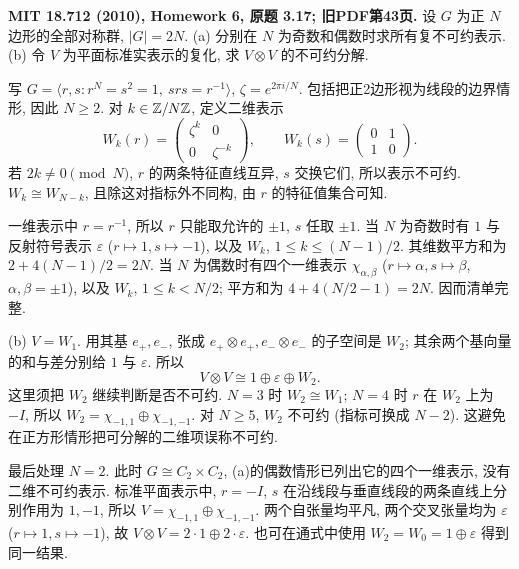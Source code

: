 \begin{exercise}\label{hw:3.17}
\textbf{MIT 18.712 (2010), Homework 6, 原题 3.17; 旧PDF第43页.}
设 $G$ 为正 $N$ 边形的全部对称群, $|G|=2N$.
(a) 分别在 $N$ 为奇数和偶数时求所有复不可约表示.
(b) 令 $V$ 为平面标准实表示的复化, 求 $V\otimes V$ 的不可约分解.
\end{exercise}
\begin{solution}
写 $G=\langle r,s:r^N=s^2=1,\ srs=r^{-1}\rangle$, $\zeta=e^{2\pi i/N}$. 包括把正2边形视为线段的边界情形, 因此 $N\ge2$. 对 $k\in\mathbb Z/N\mathbb Z$, 定义二维表示
\[
 W_k(r)=\begin{pmatrix}\zeta^k&0\\0&\zeta^{-k}\end{pmatrix},
 \qquad W_k(s)=\begin{pmatrix}0&1\\1&0\end{pmatrix}.
\]
若 $2k\ne0\pmod N$, $r$ 的两条特征直线互异, $s$ 交换它们, 所以表示不可约. $W_k\cong W_{N-k}$, 且除这对指标外不同构, 由 $r$ 的特征值集合可知.

一维表示中 $r=r^{-1}$, 所以 $r$ 只能取允许的 $\pm1$, $s$ 任取 $\pm1$. 当 $N$ 为奇数时有 $1$ 与反射符号表示 $\varepsilon$ ($r\mapsto1,s\mapsto-1$), 以及 $W_k$, $1\le k\le(N-1)/2$. 其维数平方和为 $2+4(N-1)/2=2N$. 当 $N$ 为偶数时有四个一维表示 $\chi_{\alpha,\beta}$ ($r\mapsto\alpha,s\mapsto\beta$, $\alpha,\beta=\pm1$), 以及 $W_k$, $1\le k<N/2$; 平方和为 $4+4(N/2-1)=2N$. 因而清单完整.

(b) $V=W_1$. 用其基 $e_+,e_-$, 张成 $e_+\otimes e_+,e_-\otimes e_-$ 的子空间是 $W_2$; 其余两个基向量的和与差分别给 $1$ 与 $\varepsilon$. 所以
\[
 V\otimes V\cong1\oplus\varepsilon\oplus W_2.
\]
这里须把 $W_2$ 继续判断是否不可约. $N=3$ 时 $W_2\cong W_1$; $N=4$ 时 $r$ 在 $W_2$ 上为 $-I$, 所以 $W_2=\chi_{-1,1}\oplus\chi_{-1,-1}$. 对 $N\ge5$, $W_2$ 不可约 (指标可换成 $N-2$). 这避免在正方形情形把可分解的二维项误称不可约.

最后处理 $N=2$. 此时 $G\cong C_2\times C_2$, (a)的偶数情形已列出它的四个一维表示, 没有二维不可约表示. 标准平面表示中, $r=-I$, $s$ 在沿线段与垂直线段的两条直线上分别作用为 $1,-1$, 所以 $V=\chi_{-1,1}\oplus\chi_{-1,-1}$. 两个自张量均平凡, 两个交叉张量均为 $\varepsilon$ ($r\mapsto1,s\mapsto-1$), 故 $V\otimes V=2\cdot1\oplus2\cdot\varepsilon$. 也可在通式中使用 $W_2=W_0=1\oplus\varepsilon$ 得到同一结果.
\end{solution}


